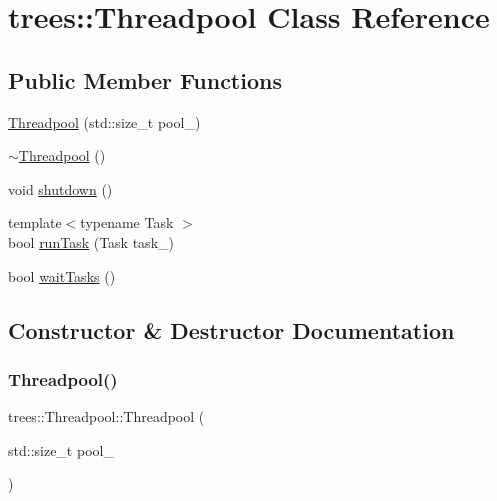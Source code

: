 \hypertarget{classtrees_1_1_threadpool}{}\section{trees\+:\+:Threadpool Class Reference}
\label{classtrees_1_1_threadpool}
\subsection*{Public Member Functions}
\begin{DoxyCompactItemize}
\item 
\hyperlink{classtrees_1_1_threadpool_a2ddeee4f43093bc52ff011213def07e4}{Threadpool} (std\+::size\+\_\+t pool\+\_\+)
\item 
\hyperlink{classtrees_1_1_threadpool_afb783a8a8b881f2f0be9cae58550d345}{$\sim$\+Threadpool} ()
\item 
void \hyperlink{classtrees_1_1_threadpool_a3d6488b730cc53472239f9c74e384d64}{shutdown} ()
\item 
{\footnotesize template$<$typename Task $>$ }\\bool \hyperlink{classtrees_1_1_threadpool_a5aa569f51cc6095e8017500c7e6b074d}{run\+Task} (Task task\+\_\+)
\item 
bool \hyperlink{classtrees_1_1_threadpool_a5675fede770bf61c78cdd2d0250acc93}{wait\+Tasks} ()
\end{DoxyCompactItemize}


\subsection{Constructor \& Destructor Documentation}
\mbox{\label{classtrees_1_1_threadpool_a2ddeee4f43093bc52ff011213def07e4}} 
\subsubsection{\texorpdfstring{Threadpool()}{Threadpool()}}
{\footnotesize\ttfamily trees\+::\+Threadpool\+::\+Threadpool (\begin{DoxyParamCaption}\item[{std\+::size\+\_\+t}]{pool\+\_\+ }\end{DoxyParamCaption})\hspace{0.3cm}{\ttfamily [inline]}}

